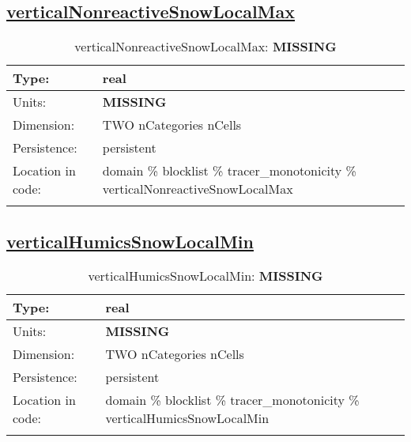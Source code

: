 \subsection[verticalNonreactiveSnowLocalMax]{\hyperref[sec:var_tab_tracer_monotonicity]{verticalNonreactiveSnowLocalMax}}
\label{subsec:var_sec_tracer_monotonicity_verticalNonreactiveSnowLocalMax}
\begin{center}
\begin{longtable}{| p{2.0in} | p{4.0in} |}
        \hline 
        Type: & real \\
        \hline 
        Units: & {\bf \color{red} MISSING} \\
        \hline 
        Dimension: & TWO nCategories nCells \\
        \hline 
        Persistence: & persistent \\
        \hline 
         Location in code: & domain \% blocklist \% tracer\_monotonicity \% verticalNonreactiveSnowLocalMax \\
         \hline 
    \caption{verticalNonreactiveSnowLocalMax: {\bf \color{red} MISSING}}
\end{longtable}
\end{center}
\subsection[verticalHumicsSnowLocalMin]{\hyperref[sec:var_tab_tracer_monotonicity]{verticalHumicsSnowLocalMin}}
\label{subsec:var_sec_tracer_monotonicity_verticalHumicsSnowLocalMin}
\begin{center}
\begin{longtable}{| p{2.0in} | p{4.0in} |}
        \hline 
        Type: & real \\
        \hline 
        Units: & {\bf \color{red} MISSING} \\
        \hline 
        Dimension: & TWO nCategories nCells \\
        \hline 
        Persistence: & persistent \\
        \hline 
         Location in code: & domain \% blocklist \% tracer\_monotonicity \% verticalHumicsSnowLocalMin \\
         \hline 
    \caption{verticalHumicsSnowLocalMin: {\bf \color{red} MISSING}}
\end{longtable}
\end{center}
